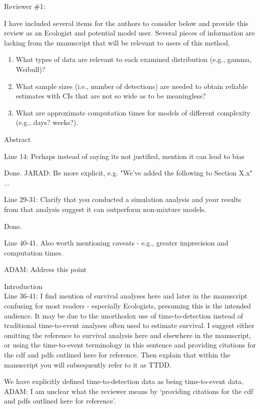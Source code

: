 \documentclass[12pt]{article}
\renewenvironment{quote}  %
              {\list{}{\rightmargin\leftmargin}\normalfont%
               \item\relax}
              {\endlist}
\newcommand{\adam}[1]{{\color{blue} ADAM: #1}}
\newcommand{\jarad}[1]{{\color{Orange} JARAD: #1}}
\begin{document}
\newpage



Reviewer \#1:

I have included several items for the authors to consider below and provide this review as an Ecologist and potential model user.
Several pieces of information are lacking from the manuscript that will be relevant to users of this method.
\begin{enumerate}
\item What types of data are relevant to each examined distribution (e.g., gamma, Weibull)?
\item What sample sizes (i.e., number of detections) are needed to obtain reliable estimates with CIs that are not so wide as to be meaningless?
\item What are approximate computation times for models of different complexity (e.g., days? weeks?).
\end{enumerate}

Abstract

Line 14: Perhaps instead of saying its not justified, mention it can lead to bias
\begin{quote}
Done. \jarad{Be more explicit, e.g. "We've added the following to Section X.x" ...}
\end{quote}

Line 29-31: Clarify that you conducted a simulation analysis and your results from that analysis suggest it can outperform non-mixture models.
\begin{quote}
Done.
\end{quote}

Line 40-41.  Also worth mentioning caveats - e.g., greater imprecision and computation times.
\begin{quote}
\adam{Address this point}
\end{quote}

Introduction\\
Line 36-41: I find mention of survival analyses here and later in the manuscript confusing for most readers - especially Ecologists, presuming this is the intended audience.  It may be due to the unorthodox use of time-to-detection instead of traditional time-to-event analyses often used to estimate survival.  I suggest either omitting the reference to survival analysis here and elsewhere in the manuscript, or using the time-to-event terminology in this sentence and providing citations for the cdf and pdfs outlined here for reference.  Then explain that within the manuscript you will subsequently refer to it as TTDD.  
\begin{quote}
We have explicitly defined time-to-detection data as being time-to-event data.\\
\adam{I am unclear what the reviewer means by `providing citations for the cdf and pdfs outlined here for reference'.}
\end{quote}
\end{document}
